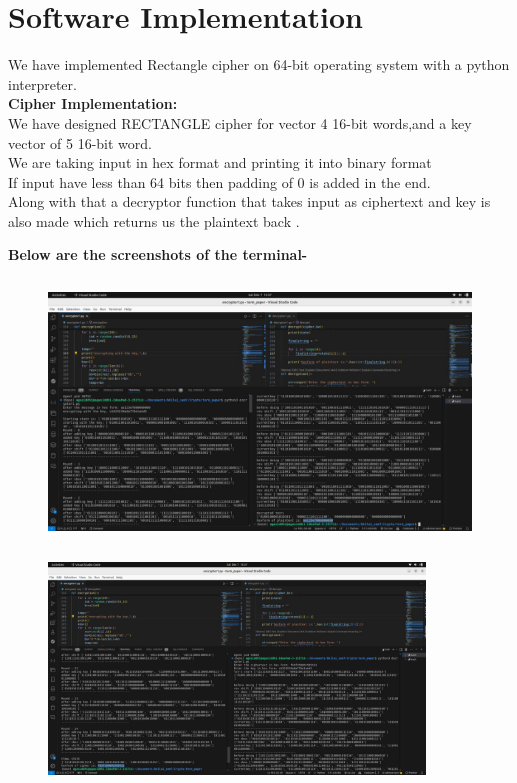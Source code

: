 \documentclass[journal=tosc,preprint]{iacrtrans}
\begin{document}
\section{Software Implementation}
We have implemented Rectangle cipher on 64-bit operating system with a python interpreter.\\
\textbf{Cipher Implementation: }\\
We have designed RECTANGLE cipher for vector 4 16-bit words,and a key vector of 5 16-bit word.\\
We are taking input in hex format and printing it into binary format\\
If input have less than 64 bits then padding of 0 is added in the end.\\
Along with that a decryptor function that takes input as ciphertext and key is also made which returns us the plaintext back .

\textbf{Below are the screenshots of the terminal-}\\

\begin{figure}[htp]
    \centering
    \includegraphics[height=7cm]{encryptor.jpg}
\end{figure}


\begin{figure}[htp]
    \centering
    \includegraphics[width=10cm]{encryptor-2.jpg}
\end{figure}
\end{document}
